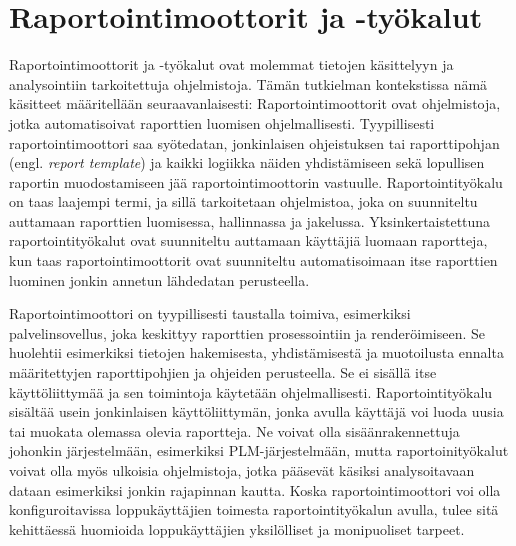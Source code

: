 \section{Raportointimoottorit ja -työkalut} \label{Raportointimoottorit ja -työkalut}

Raportointimoottorit ja -työkalut ovat molemmat tietojen käsittelyyn ja analysointiin tarkoitettuja ohjelmistoja. Tämän tutkielman kontekstissa nämä käsitteet määritellään seuraavanlaisesti: Raportointimoottorit ovat ohjelmistoja, jotka automatisoivat raporttien luomisen ohjelmallisesti. Tyypillisesti raportointimoottori saa syötedatan, jonkinlaisen ohjeistuksen tai raporttipohjan (engl. \textit{report template}) ja kaikki logiikka näiden yhdistämiseen sekä lopullisen raportin muodostamiseen jää raportointimoottorin vastuulle.  \cite{he_design_2010} Raportointityökalu on taas laajempi termi, ja sillä tarkoitetaan ohjelmistoa, joka on suunniteltu auttamaan raporttien luomisessa, hallinnassa ja jakelussa. Yksinkertaistettuna raportointityökalut ovat suunniteltu auttamaan käyttäjiä luomaan raportteja, kun taas raportointimoottorit ovat suunniteltu automatisoimaan itse raporttien luominen jonkin annetun lähdedatan perusteella.

Raportointimoottori on tyypillisesti taustalla toimiva, esimerkiksi palvelinsovellus, joka keskittyy raporttien prosessointiin ja renderöimiseen. Se huolehtii esimerkiksi tietojen hakemisesta, yhdistämisestä ja muotoilusta ennalta määritettyjen raporttipohjien ja ohjeiden perusteella. Se ei sisällä itse käyttöliittymää ja sen toimintoja käytetään ohjelmallisesti. Raportointityökalu sisältää usein jonkinlaisen käyttöliittymän, jonka avulla käyttäjä voi luoda uusia tai muokata olemassa olevia raportteja. Ne voivat olla sisäänrakennettuja johonkin järjestelmään, esimerkiksi PLM-järjestelmään, mutta raportoinityökalut voivat olla myös ulkoisia ohjelmistoja, jotka pääsevät käsiksi analysoitavaan dataan esimerkiksi jonkin rajapinnan kautta. Koska raportointimoottori voi olla konfiguroitavissa loppukäyttäjien toimesta raportointityökalun avulla, tulee sitä kehittäessä huomioida loppukäyttäjien yksilölliset ja monipuoliset tarpeet. \cite{adhi_performance_2019}

